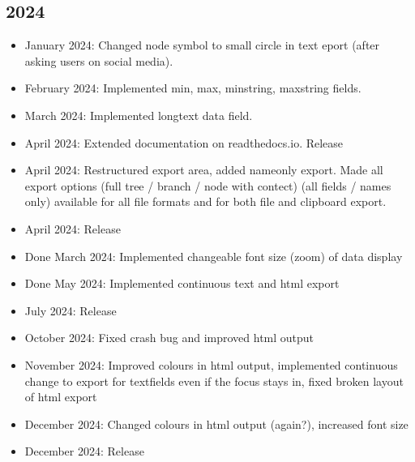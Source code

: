 \documentclass[letterpaper,10pt,english]{sphinxmanual}
\begin{document}
\subsection{2024}
\label{\detokenize{releases:id10}}\begin{itemize}
\item {} 
\sphinxAtStartPar
January 2024: Changed node symbol to small circle in text eport (after asking users on social media).

\item {} 
\sphinxAtStartPar
February 2024: Implemented min, max, min\sphinxhyphen{}string, max\sphinxhyphen{}string fields.

\item {} 
\sphinxAtStartPar
March 2024: Implemented longtext data field.

\item {} 
\sphinxAtStartPar
April 2024: Extended documentation on readthedocs.io. Release 

\item {} 
\sphinxAtStartPar
April 2024: Restructured export area, added name\sphinxhyphen{}only export. Made all export options (full tree / branch / node with contect) (all fields / names only) available for all file formats and for both file and clipboard export.

\item {} 
\sphinxAtStartPar
April 2024: Release 

\item {} 
\sphinxAtStartPar
Done March 2024: Implemented changeable font size (zoom) of data display

\item {} 
\sphinxAtStartPar
Done May 2024:  Implemented continuous text and html export

\item {} 
\sphinxAtStartPar
July 2024: Release 

\item {} 
\sphinxAtStartPar
October 2024: Fixed crash bug and improved html output

\item {} 
\sphinxAtStartPar
November 2024: Improved colours in html output, implemented continuous change to export for textfields even if the focus stays in, fixed broken layout of html export

\item {} 
\sphinxAtStartPar
December 2024: Changed colours in html output (again?), increased font size

\item {} 
\sphinxAtStartPar
December 2024: Release 

\end{itemize}
\end{document}

